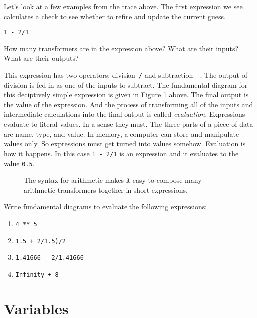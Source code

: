 Let's look at a few examples from the trace above. The first expression we see
calculates a check to see whether to refine and update the current guess.

\begin{center}
  \texttt{1 - 2/1}
\end{center}

\begin{question}
How many transformers are in the expression above? What are their inputs? What
are their outputs?
\end{question}

This expression has two operators: division~\texttt{/} and
subtraction~\texttt{-}. The output of division is fed in as one of the inputs to
subtract. The fundamental diagram for this deciptively simple expression is
given in Figure \ref{fig:intro-expression-fundamental-diagram} above. The final
output is the value of the expression. And the process of transforming all of
the inputs and intermediate calculations into the final output is called
\emph{evaluation}. Expressions evaluate to literal values. In a sense they must.
The three parts of a piece of data are name, type, and value. In memory, a
computer can store and manipulate values only. So expressions must get turned
into values somehow. Evaluation is how it happens. In this case \texttt{1 - 2/1}
is an expression and it evaluates to the value \texttt{0.5}.

\begin{figure}
  
\caption{\label{fig:intro-expression-fundamental-diagram} The syntax for
arithmetic makes it easy to compose many arithmetic transformers together in
short expressions.}
\end{figure}

\begin{question}
  Write fundamental diagrams to evaluate the following expressions:
  \begin{enumerate}
    \item \texttt{4 ** 5}
    \item \texttt{1.5 + 2/1.5)/2}
    \item \texttt{1.41666 - 2/1.41666}
    \item \texttt{Infinity + 8}
  \end{enumerate}
\end{question}

\section{Variables}

